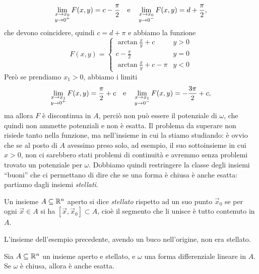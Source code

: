 \begin{equation}
	\lim_{\substack{x\to x_0\\ y\to 0^+}}F(x,y)=c-\frac{\pi}2\quad\text{e}\quad\lim_{\substack{x\to x_0\\ y\to 0^-}}F(x,y)=d+\frac{\pi}2,
\end{equation}
che devono coincidere, quindi $c=d+\pi$ e abbiamo la funzione
\begin{equation}
	F(x,y)=
	\begin{cases}
		\arctan\frac{x}{y}+c	&y>0\\
		c-\frac{\pi}2			&y=0\\
		\arctan\frac{x}{y}+c-\pi	&y<0
	\end{cases}
\end{equation}
Però se prendiamo $x_1>0$, abbiamo i limiti
\begin{equation}
	\lim_{\substack{x\to x_1\\ y\to 0^+}}F(x,y)=\frac{\pi}2+c\quad\text{e}\quad\lim_{\substack{x\to x_1\\ y\to 0^-}}F(x,y)=-\frac{3\pi}2+c,
\end{equation}
ma allora $F$ è discontinua in $A$, perciò non può essere il potenziale di $\omega$, che quindi non ammette potenziali e non è esatta.
Il problema da superare non risiede tanto nella funzione, ma nell'insieme in cui la stiamo studiando: è ovvio che se al posto di $A$ avessimo preso solo, ad esempio, il suo sottoinsieme in cui $x>0$, non ci sarebbero stati problemi di continuità e avremmo senza problemi trovato un potenziale per $\omega$.
Dobbiamo quindi restringere la classe degli insiemi ``buoni'' che ci permettano di dire che se una forma è chiusa è anche esatta: partiamo dagli insiemi \emph{stellati}.
\begin{definizione} \label{d:insieme-stellato}
	Un insieme $A\subseteq\mathbb{R}^n$ aperto si dice \emph{stellato} rispetto ad un suo punto $\vec x_0$ se per ogni $\vec x\in A$ si ha $[\vec x,\vec x_0]\subset A$, cioè il segmento che li unisce è tutto contenuto in $A$.
\end{definizione}
L'insieme dell'esempio precedente, avendo un buco nell'origine, non era stellato.
\begin{teorema} \label{t:forma-chiusa-stellato}
	Sia $A\subseteq\mathbb{R}^n$ un insieme aperto e stellato, e $\omega$ una forma differenziale lineare in $A$. Se $\omega$ è chiusa, allora è anche esatta.
\end{teorema}
